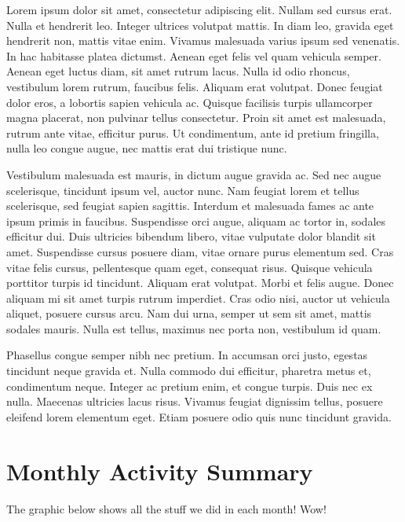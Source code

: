 \documentclass[a4paper,12pt,twoside]{article}
\begin{document}
\begin{multicols}{2}
\color{red}
Lorem ipsum dolor sit amet, consectetur adipiscing elit. Nullam sed cursus erat. Nulla et hendrerit leo. Integer ultrices volutpat mattis. In diam leo, gravida eget hendrerit non, mattis vitae enim. Vivamus malesuada varius ipsum sed venenatis. In hac habitasse platea dictumst. Aenean eget felis vel quam vehicula semper. Aenean eget luctus diam, sit amet rutrum lacus. Nulla id odio rhoncus, vestibulum lorem rutrum, faucibus felis. Aliquam erat volutpat. Donec feugiat dolor eros, a lobortis sapien vehicula ac. Quisque facilisis turpis ullamcorper magna placerat, non pulvinar tellus consectetur. Proin sit amet est malesuada, rutrum ante vitae, efficitur purus. Ut condimentum, ante id pretium fringilla, nulla leo congue augue, nec mattis erat dui tristique nunc.

Vestibulum malesuada est mauris, in dictum augue gravida ac. Sed nec augue scelerisque, tincidunt ipsum vel, auctor nunc. Nam feugiat lorem et tellus scelerisque, sed feugiat sapien sagittis. Interdum et malesuada fames ac ante ipsum primis in faucibus. Suspendisse orci augue, aliquam ac tortor in, sodales efficitur dui. Duis ultricies bibendum libero, vitae vulputate dolor blandit sit amet. Suspendisse cursus posuere diam, vitae ornare purus elementum sed. Cras vitae felis cursus, pellentesque quam eget, consequat risus. Quisque vehicula porttitor turpis id tincidunt. Aliquam erat volutpat. Morbi et felis augue. Donec aliquam mi sit amet turpis rutrum imperdiet. Cras odio nisi, auctor ut vehicula aliquet, posuere cursus arcu. Nam dui urna, semper ut sem sit amet, mattis sodales mauris. Nulla est tellus, maximus nec porta non, vestibulum id quam.

Phasellus congue semper nibh nec pretium. In accumsan orci justo, egestas tincidunt neque gravida et. Nulla commodo dui efficitur, pharetra metus et, condimentum neque. Integer ac pretium enim, et congue turpis. Duis nec ex nulla. Maecenas ultricies lacus risus. Vivamus feugiat dignissim tellus, posuere eleifend lorem elementum eget. Etiam posuere odio quis nunc tincidunt gravida. 

\end{multicols}

\newpage
\section{Monthly Activity Summary}

The graphic below shows all the stuff we did in each month! Wow!
\end{document}
